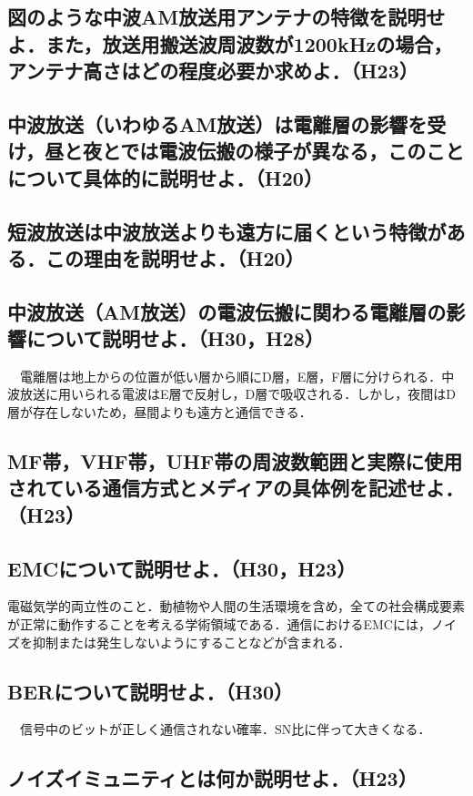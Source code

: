 \subsection{図のような中波AM放送用アンテナの特徴を説明せよ．また，放送用搬送波周波数が1200kHzの場合，アンテナ高さはどの程度必要か求めよ．（H23）}

\subsection{中波放送（いわゆるAM放送）は電離層の影響を受け，昼と夜とでは電波伝搬の様子が異なる，このことについて具体的に説明せよ．（H20）}

\subsection{短波放送は中波放送よりも遠方に届くという特徴がある．この理由を説明せよ．（H20）}

\subsection{中波放送（AM放送）の電波伝搬に関わる電離層の影響について説明せよ．（H30，H28）}
　電離層は地上からの位置が低い層から順にD層，E層，F層に分けられる．中波放送に用いられる電波はE層で反射し，D層で吸収される．しかし，夜間はD層が存在しないため，昼間よりも遠方と通信できる．

\subsection{MF帯，VHF帯，UHF帯の周波数範囲と実際に使用されている通信方式とメディアの具体例を記述せよ．（H23）}

\subsection{EMCについて説明せよ．（H30，H23）}
電磁気学的両立性のこと．動植物や人間の生活環境を含め，全ての社会構成要素が正常に動作することを考える学術領域である．通信におけるEMCには，ノイズを抑制または発生しないようにすることなどが含まれる．

\subsection{BERについて説明せよ．（H30）}
　信号中のビットが正しく通信されない確率．SN比に伴って大きくなる．

\subsection{ノイズイミュニティとは何か説明せよ．（H23）}

